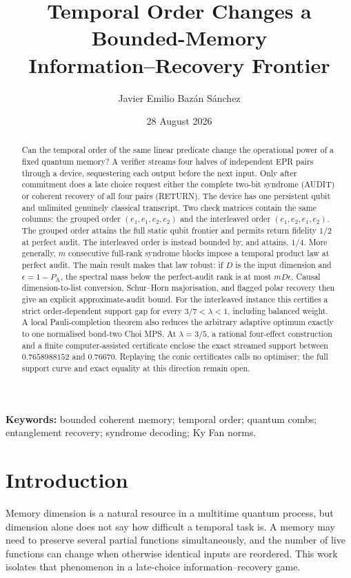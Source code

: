 \documentclass[10pt,twocolumn]{article}
\title{\textbf{Temporal Order Changes a Bounded-Memory\\Information--Recovery Frontier}}
\author[1]{Javier Emilio Baz\'an S\'anchez}
\affil[1]{Facultad de Ciencias, Universidad Nacional Aut\'onoma de M\'exico, Mexico City, Mexico\\
\texttt{bazan@ciencias.unam.mx}}
\date{28 August 2026}
\theoremstyle{remark}
\newcommand{\PA}{P_{\mathrm A}}
\begin{document}
\maketitle

\begin{abstract}
Can the temporal order of the same linear predicate change the operational
power of a fixed quantum memory? A verifier streams four halves of independent
EPR pairs through a device, sequestering each output before the next input.
Only after commitment does a late choice request either the complete two-bit
syndrome (AUDIT) or coherent recovery of all four pairs (RETURN). The device
has one persistent qubit and unlimited genuinely classical transcript. Two
check matrices contain the same columns: the grouped order
$(e_1,e_1,e_2,e_2)$ and the interleaved order
$(e_1,e_2,e_1,e_2)$. The grouped order attains the full static qubit frontier
and permits return fidelity $1/2$ at perfect audit. The interleaved order is
instead bounded by, and attains, $1/4$. More generally, $m$ consecutive
full-rank syndrome blocks impose a temporal product law at perfect audit.
The main result makes that law robust: if $D$ is the input dimension and
$\epsilon=1-\PA$, the spectral mass below the perfect-audit rank is at most
$mD\epsilon$. Causal dimension-to-list conversion, Schur--Horn majorisation,
and flagged polar recovery then give an explicit approximate-audit bound. For
the interleaved instance this certifies a strict order-dependent support gap
for every $3/7<\lambda<1$, including balanced weight. A local
Pauli-completion theorem also reduces the arbitrary adaptive optimum exactly
to one normalised bond-two Choi MPS. At $\lambda=3/5$, a rational
four-effect construction and a finite computer-assisted certificate enclose
the exact streamed support between $0.7658988152$ and $0.76670$. Replaying
the conic certificates calls no optimiser; the full support curve and exact
equality at this direction remain open.
\end{abstract}

\noindent\textbf{Keywords:} bounded coherent memory; temporal order; quantum
combs; entanglement recovery; syndrome decoding; Ky Fan norms.

\section{Introduction}

Memory dimension is a natural resource in a multitime quantum process, but
dimension alone does not say how difficult a temporal task is. A memory may
need to preserve several partial functions simultaneously, and the number of
live functions can change when otherwise identical inputs are reordered. This
work isolates that phenomenon in a late-choice information--recovery game.
\end{document}

